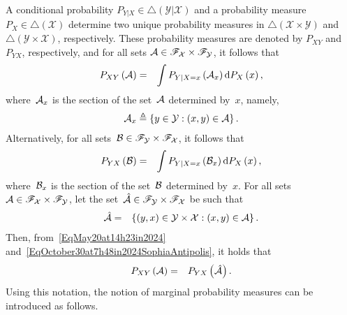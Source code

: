 \documentclass[lettersize,onecolumn]{IEEEtran}
\begin{document}
A conditional probability $P_{Y|X} \in \triangle(\mathcal{Y} | \mathcal{X})$ and a probability measure $P_X \in \triangle(\mathcal{X})$ determine two unique probability measures in $\triangle(\mathcal{X} \times \mathcal{Y})$ and $\triangle(\mathcal{Y} \times \mathcal{X})$, respectively. These probability measures are denoted by $P_{XY}$ and $P_{YX}$, respectively, and for all sets $\mathcal{A} \in \mathscr{F}_{\mathcal X} \times \mathscr{F}_{\mathcal Y}$, it follows that
%
\begin{eqnarray}
\label{EqMay20at14h23in2024}
P_{X Y }\left( \mathcal A \right) & = & \int P_{Y |X =x} \left( \mathcal A_{x}\right) \mathrm{d} P_{X} \left(x\right),
\end{eqnarray}
where~$\mathcal A_{x}$ is the section of the set~$\mathcal A$ determined by~$x$, namely, 
\begin{eqnarray}
\label{EqNovember15at16h57in2024InTheBusToNice}
\mathcal A_{x} \triangleq \left\lbrace y \in \mathcal Y: (x,y) \in \mathcal A \right\rbrace.
\end{eqnarray}
%
Alternatively,  for all sets~$\mathcal B \in \mathscr{F}_{\mathcal Y} \times \mathscr{F}_{\mathcal X}$, it follows that
\begin{eqnarray}
\label{EqOctober30at7h48in2024SophiaAntipolis}
P_{ YX } \left( \mathcal B \right) & = & \int P_{Y |X =x} \left( \mathcal B_{x}\right) \mathrm{d} P_{X} \left(x\right),
\end{eqnarray}
where~$\mathcal B_{x}$ is the section of the set~$\mathcal B$ determined by~$x$. 
%
For all sets~$\mathcal A \in  \mathscr{F}_{\mathcal X} \times \mathscr{F}_{\mathcal Y}$, let the set~$\hat{\mathcal A} \in  \mathscr{F}_{\mathcal Y} \times \mathscr{F}_{\mathcal X}$ be such that 
\begin{eqnarray}
\label{EqNovember16at18h49in2024Nice}
\hat{\mathcal A}  & = & \left\lbrace (y, x) \in\mathcal Y \times \mathcal X:  (x , y) \in \mathcal A \right\rbrace.
\end{eqnarray}
Then, from~\eqref{EqMay20at14h23in2024} and~\eqref{EqOctober30at7h48in2024SophiaAntipolis}, it holds that
\begin{eqnarray}\label{EqJanuary10at16h43in2025}
P_{XY }\left( \mathcal A \right) & = & P_{YX}\left( \hat{\mathcal A} \right).
\end{eqnarray}
%
Using this notation, the notion of marginal probability measures can be introduced as follows. 
\end{document}
